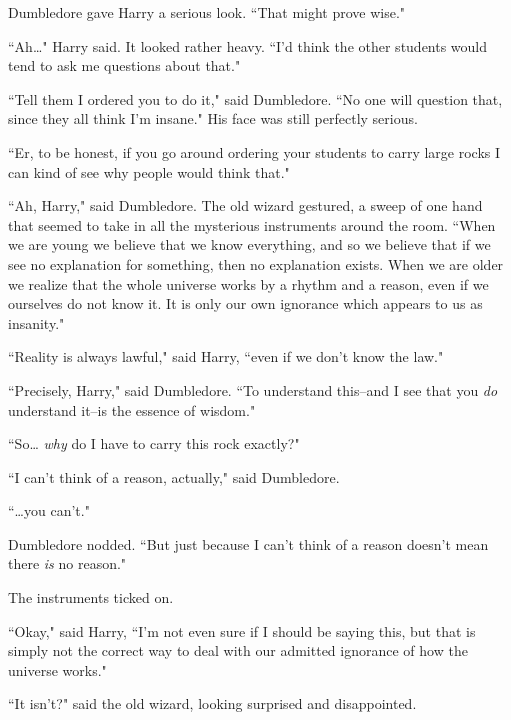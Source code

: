 Dumbledore gave Harry a serious look. ``That might prove wise."

``Ah{\ldots}" Harry said. It looked rather heavy. ``I'd think the other students would tend to ask me questions about that."

``Tell them I ordered you to do it," said Dumbledore. ``No one will question that, since they all think I'm insane." His face was still perfectly serious.

``Er, to be honest, if you go around ordering your students to carry large rocks I can kind of see why people would think that."

``Ah, Harry," said Dumbledore. The old wizard gestured, a sweep of one hand that seemed to take in all the mysterious instruments around the room. ``When we are young we believe that we know everything, and so we believe that if we see no explanation for something, then no explanation exists. When we are older we realize that the whole universe works by a rhythm and a reason, even if we ourselves do not know it. It is only our own ignorance which appears to us as insanity."

``Reality is always lawful," said Harry, ``even if we don't know the law."

``Precisely, Harry," said Dumbledore. ``To understand this\---and I see that you \emph{do} understand it\---is the essence of wisdom."

``So{\ldots} \emph{why} do I have to carry this rock exactly?"

``I can't think of a reason, actually," said Dumbledore.

``{\ldots}you can't."

Dumbledore nodded. ``But just because I can't think of a reason doesn't mean there \emph{is} no reason."

The instruments ticked on.

``Okay," said Harry, ``I'm not even sure if I should be saying this, but that is simply not the correct way to deal with our admitted ignorance of how the universe works."

``It isn't?" said the old wizard, looking surprised and disappointed.

